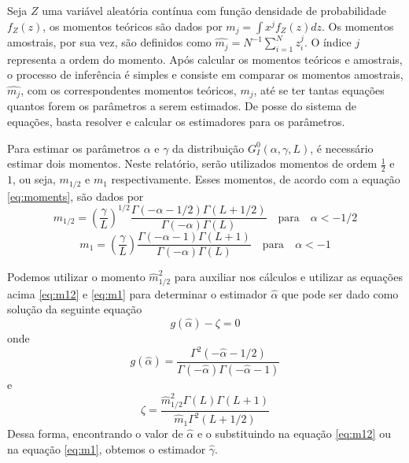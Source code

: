 \documentclass[12pt]{article}
\begin{document}
Seja $Z$ uma variável aleatória contínua com função densidade de probabilidade $f_Z(z)$, os momentos teóricos são dados por $m_j = \int x^jf_Z(z)dz$. Os momentos amostrais, por sua vez, são definidos como $\hat{m_j} = N^{-1}\sum_{i=1}^{N}z_i^j$. O índice $\textit{j}$ representa a ordem do momento. Após calcular os momentos teóricos e amostrais, o processo de inferência é simples e consiste em comparar os momentos amostrais, $\hat{m_j}$, com os correspondentes momentos teóricos, $m_j$, até se ter tantas equações quantos forem os parâmetros a serem estimados. De posse do sistema de equações, basta resolver e calcular os estimadores para os parâmetros.

Para estimar os parâmetros $\alpha$ e $\gamma$ da distribuição $G_I^0(\alpha, \gamma, L)$, é necessário estimar dois momentos. Neste relatório, serão utilizados momentos de ordem $\frac{1}{2}$ e $1$, ou seja, $m_{1/2}$ e $m_1$ respectivamente. Esses momentos, de acordo com a equação \eqref{eq:moments}, são dados por
\begin{equation}
    m_{1/2} = \left ( \frac{\gamma}{L}\right )^{1/2} \frac{\Gamma(-\alpha-1/2)\Gamma(L+1/2)}{\Gamma(-\alpha)\Gamma(L)} \quad \text{para} \quad \alpha < -1/2 \label{eq:m12}
\end{equation}
\begin{equation}
    m_{1} = \left ( \frac{\gamma}{L}\right ) \frac{\Gamma(-\alpha-1)\Gamma(L+1)}{\Gamma(-\alpha)\Gamma(L)} \quad \text{para} \quad \alpha < -1 \label{eq:m1}
\end{equation}

Podemos utilizar o momento $\hat{m}_{1/2}^2$ para auxiliar nos cálculos e utilizar as equações acima \eqref{eq:m12} e \eqref{eq:m1} para determinar o estimador $\hat{\alpha}$ que pode ser dado como solução da seguinte equação
\begin{equation}
    g(\hat{\alpha}) - \zeta = 0
\end{equation}
onde 
\begin{equation}
    g(\hat{\alpha}) = \frac{\Gamma^2(-\hat{\alpha} - 1/2)}{\Gamma(-\hat{\alpha})\Gamma(-\hat{\alpha} - 1)}
\end{equation}
e
\begin{equation}
    \zeta = \frac{\hat{m}_{1/2}^2\Gamma(L)\Gamma(L+1)}{\hat{m}_{1}\Gamma^2(L+1/2)}
\end{equation}
Dessa forma, encontrando o valor de $\hat{\alpha}$ e o substituindo na equação \eqref{eq:m12} ou na equação \eqref{eq:m1}, obtemos o estimador $\hat{\gamma}$.
\end{document}
